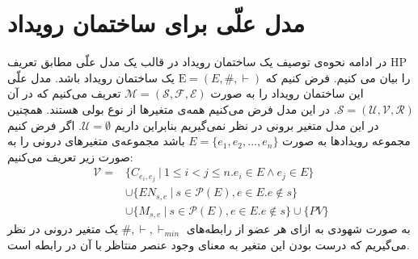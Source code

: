\documentclass[
msc,
irfonts
]{./tex/tehran-thesis}
\newcommand{\پ}{پروژه/پایان‌نامه/رساله }
\theoremstyle{definition}
\theoremstyle{theorem}
\theoremstyle{definition}
\numberwithin{algorithm}{chapter}
\newcommand{\s}[1]{\{#1\}}
\newcommand{\e}{\emptyset}
\newcommand{\mc}[1]{\mathcal{#1}}
\newcommand{\mr}[1]{\mathrm{#1}}
\begin{document}
\section{مدل علّی برای ساختمان رویداد}
\label{es-causal-model}
در ادامه نحوه‌ی توصیف یک ساختمان رویداد در قالب یک مدل علّی مطابق تعریف 
HP
را بیان می کنیم.
فرض کنیم که
$\mr{E} = (E,\#,\vdash)$
یک ساختمان رویداد باشد.
مدل علّی این ساختمان رویداد را به صورت
$\mc{M} = (\mc{S},\mc{F},\mc{E})$
تعریف می‌کنیم که در آن
$\mc{S} = (\mc{U},\mc{V},\mc{R})$.
در این مدل فرض می‌کنیم همه‌ی متغیر‌ها از نوع بولی هستند.
همچنین در این مدل متغیر برونی در نظر نمی‌گیریم بنابراین داریم
$\mc{U} = \e$.
اگر فرض کنیم مجموعه‌ رویدادها به صورت
$E = \s{e_1,e_2,...,e_n}$
باشد مجموعه‌ی متغیر‌های درونی را به صورت زیر تعریف می‌کنیم:
\begin{align*}
    \mathcal{V} = & \s{C_{e_i,e_j} ~|~  1 \leq i < j \leq n.
    e_i \in E \wedge e_j \in E}                              \\
                  & \cup \s{EN_{s,e} ~|~ s \in \mathcal{P}(E),
    e \in E. e \not \in s }                                  \\
                  & \cup \s{M_{s,e} ~|~ s \in \mathcal{P}(E),
        e \in E. e \not \in s } \cup \s{PV}
\end{align*}
به صورت شهودی به ازای هر عضو از رابطه‌های
$\#,\vdash,\vdash_{min}$
یک متغیر درونی در نظر می‌گیریم که درست بودن این متغیر به معنای وجود عنصر منتاظر با آن در رابطه است.
\end{document}
